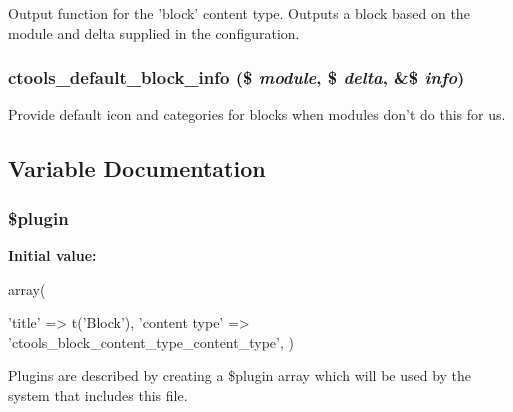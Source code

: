 Output function for the 'block' content type. Outputs a block based on the module and delta supplied in the configuration. \hypertarget{block_8inc_a124d6c84518ab0aa06724bd45b03fa38}{
\subsubsection[{ctools\_\-default\_\-block\_\-info}]{\setlength{\rightskip}{0pt plus 5cm}ctools\_\-default\_\-block\_\-info (\$ {\em module}, \/  \$ {\em delta}, \/  \&\$ {\em info})}}
\label{block_8inc_a124d6c84518ab0aa06724bd45b03fa38}
Provide default icon and categories for blocks when modules don't do this for us. 

\subsection{Variable Documentation}
\hypertarget{block_8inc_ada8a7130088351710bb02ed622d6bf65}{
\subsubsection[{\$plugin}]{\setlength{\rightskip}{0pt plus 5cm}\$plugin}}
\label{block_8inc_ada8a7130088351710bb02ed622d6bf65}
{\bfseries Initial value:}
\begin{DoxyCode}
 array(
  
  
  'title' => t('Block'),
  'content type' => 'ctools_block_content_type_content_type',
)
\end{DoxyCode}
Plugins are described by creating a \$plugin array which will be used by the system that includes this file. 
